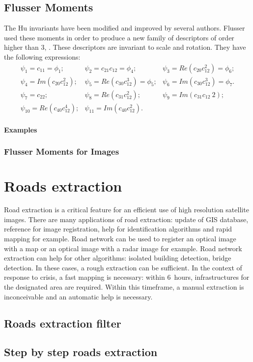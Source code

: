 \subsection{Flusser Moments}
\label{sec:FlusserMoments}
The Hu invariants have been modified and
improved by several authors. Flusser used these moments in order to
produce a new family of descriptors of order higher than 3,
\cite{flusserinv}. These descriptors are invariant to scale and
rotation. They have the following expressions:
\begin {equation}
\begin{array}{ccc}
\psi_1  = c_{11} = \phi_1; &  \psi_2  = c_{21}c_{12} = \phi_4; & \psi_3  = Re(c_{20}c_{12}^2) = \phi_6;\\
\psi_4  = Im(c_{20}c_{12}^2); & \psi_5  = Re(c_{30}c_{12}^3) = \phi_5;
& \psi_6  = Im(c_{30}c_{12}^3) = \phi_7.\\
\psi_7  = c_{22}; & \psi_8  = Re(c_{31}c_{12}^2); & \psi_9  = Im(c_{31}c_{12}~2);\\
\psi_{10} = Re(c_{40}c_{12}^4); & \psi_{11} = Im(c_{40}c_{12}^2). &\\

\end{array}
\end {equation}

\textbf{Examples}
\subsubsection{Flusser Moments for Images}

%

\section{Roads extraction}
\label{sec:RoadExtraction}

Road extraction is a critical feature for an efficient use of high resolution satellite images. There are many applications of road extraction: update of GIS database, reference for image registration, help for identification algorithms and rapid mapping for example.  Road network can be used to register an optical image with a map or an optical image with a radar image for example. Road network extraction can help for other algorithms: isolated building detection, bridge detection. In these cases, a rough extraction can be sufficient. In the context of response to crisis, a fast mapping is necessary: within 6~hours, infrastructures for the designated area are required. Within this timeframe, a manual extraction is inconceivable and an automatic help is necessary.

\subsection{Roads extraction filter}



\subsection{Step by step roads extraction}




